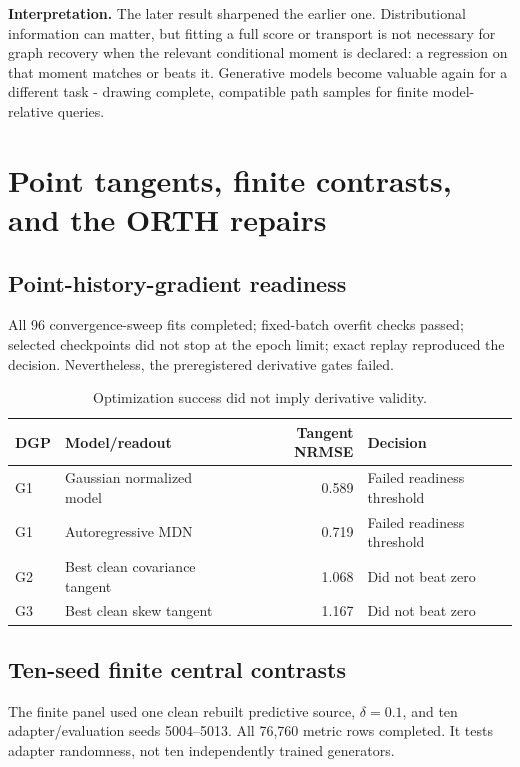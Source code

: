 \documentclass[10pt]{article}
\newcommand{\claim}[1]{\par\noindent\colorbox{pale}{\parbox{0.965\linewidth}{\textbf{Interpretation.} #1}}\par}
\begin{document}
\claim{The later result sharpened the earlier one. Distributional information can matter, but fitting a full score or transport is not necessary for graph recovery when the relevant conditional moment is declared: a regression on that moment matches or beats it. Generative models become valuable again for a different task - drawing complete, compatible path samples for finite model-relative queries.}

\section{Point tangents, finite contrasts, and the ORTH repairs}

\subsection{Point-history-gradient readiness}

All 96 convergence-sweep fits completed; fixed-batch overfit checks passed; selected checkpoints did not stop at the epoch limit; exact replay reproduced the decision. Nevertheless, the preregistered derivative gates failed.

\begin{table}[H]
\centering\small
\begin{tabularx}{0.88\linewidth}{L{1.4cm}Y r Y}
\toprule DGP & Model/readout & Tangent NRMSE & Decision \\
\midrule
G1 & Gaussian normalized model & 0.589 & Failed readiness threshold \\
G1 & Autoregressive MDN & 0.719 & Failed readiness threshold \\
G2 & Best clean covariance tangent & 1.068 & Did not beat zero \\
G3 & Best clean skew tangent & 1.167 & Did not beat zero \\
\bottomrule
\end{tabularx}
\caption{Optimization success did not imply derivative validity.}
\end{table}

\subsection{Ten-seed finite central contrasts}

The finite panel used one clean rebuilt predictive source, $\delta=0.1$, and ten adapter/evaluation seeds 5004--5013. All 76,760 metric rows completed. It tests adapter randomness, not ten independently trained generators.
\end{document}
